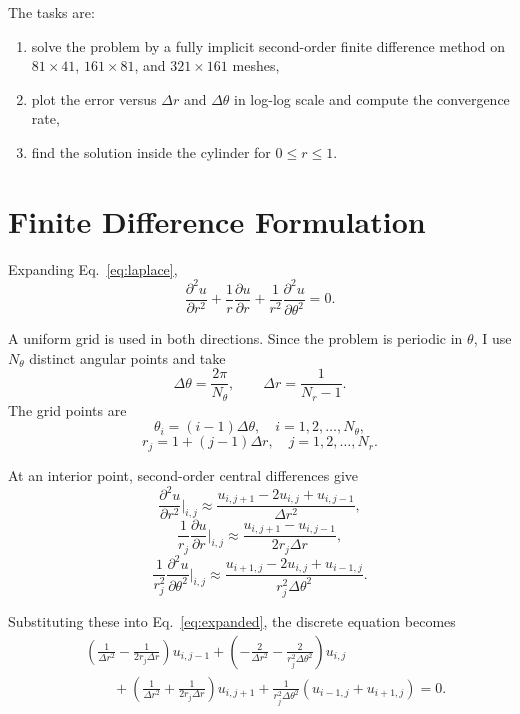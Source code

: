 \documentclass[12pt,a4paper]{article}
\begin{document}
The tasks are:
\begin{enumerate}
    \item solve the problem by a fully implicit second-order finite difference method on $81\times41$, $161\times81$, and $321\times161$ meshes,
    \item plot the error versus $\Delta r$ and $\Delta\theta$ in log-log scale and compute the convergence rate,
    \item find the solution inside the cylinder for $0\le r\le1$.
\end{enumerate}

\section*{Finite Difference Formulation}

Expanding Eq.~\eqref{eq:laplace},
\begin{equation}
\frac{\partial^2 u}{\partial r^2}+\frac{1}{r}\frac{\partial u}{\partial r}+\frac{1}{r^2}\frac{\partial^2 u}{\partial \theta^2}=0.
\label{eq:expanded}
\end{equation}

A uniform grid is used in both directions. Since the problem is periodic in $\theta$, I use $N_\theta$ distinct angular points and take
\[
\Delta\theta=\frac{2\pi}{N_\theta},
\qquad
\Delta r=\frac{1}{N_r-1}.
\]
The grid points are
\[
\theta_i=(i-1)\Delta\theta, \quad i=1,2,\dots,N_\theta,
\]
\[
r_j=1+(j-1)\Delta r, \quad j=1,2,\dots,N_r.
\]

At an interior point, second-order central differences give
\[
\frac{\partial^2 u}{\partial r^2}\bigg|_{i,j}\approx\frac{u_{i,j+1}-2u_{i,j}+u_{i,j-1}}{\Delta r^2},
\]
\[
\frac{1}{r_j}\frac{\partial u}{\partial r}\bigg|_{i,j}\approx\frac{u_{i,j+1}-u_{i,j-1}}{2r_j\Delta r},
\]
\[
\frac{1}{r_j^2}\frac{\partial^2 u}{\partial \theta^2}\bigg|_{i,j}\approx\frac{u_{i+1,j}-2u_{i,j}+u_{i-1,j}}{r_j^2\Delta\theta^2}.
\]

Substituting these into Eq.~\eqref{eq:expanded}, the discrete equation becomes
\begin{equation}
\begin{aligned}
&\left(\frac{1}{\Delta r^2}-\frac{1}{2r_j\Delta r}\right)u_{i,j-1}
+\left(-\frac{2}{\Delta r^2}-\frac{2}{r_j^2\Delta\theta^2}\right)u_{i,j} \\
&\qquad +\left(\frac{1}{\Delta r^2}+\frac{1}{2r_j\Delta r}\right)u_{i,j+1}
+\frac{1}{r_j^2\Delta\theta^2}(u_{i-1,j}+u_{i+1,j})=0.
\end{aligned}
\label{eq:fd}
\end{equation}
\end{document}
